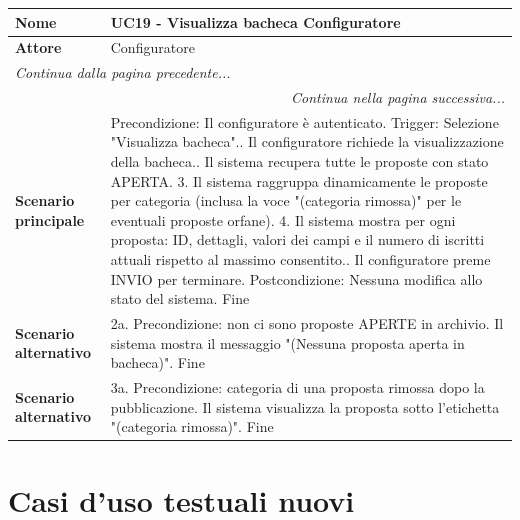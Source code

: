 \documentclass[12pt, a4paper, oneside]{report}
\begin{document}
\begin{tabularx}{\textwidth}{|l|X|}
    \hline
    \textbf{Nome}               & \textbf{UC19 - Visualizza bacheca Configuratore} \\ \hline
    \textbf{Attore}             & Configuratore \\ \hline
    \endfirsthead 
    \hline
    \multicolumn{2}{|l|}{\textit{Continua dalla pagina precedente...}} \\ \hline
    \endhead 
    \hline
    \multicolumn{2}{|r|}{\textit{Continua nella pagina successiva...}} \\ \hline
    \endfoot 
    \hline
    \endlastfoot
    \textbf{Scenario principale} & 
    Precondizione: Il configuratore è autenticato.\newline
    Trigger: Selezione "Visualizza bacheca".\newline
    1. Il configuratore richiede la visualizzazione della bacheca.\newline
    2. Il sistema recupera tutte le proposte con stato APERTA.\newline
    \textcolor{BurntOrange}{3. Il sistema raggruppa dinamicamente le proposte per categoria (inclusa la voce "(categoria rimossa)" per le eventuali proposte orfane).}\newline
    \textcolor{BurntOrange}{4. Il sistema mostra per ogni proposta: ID, dettagli, valori dei campi e il numero di iscritti attuali rispetto al massimo consentito.}\newline
    5. Il configuratore preme INVIO per terminare.\newline
    Postcondizione: Nessuna modifica allo stato del sistema.\newline
    Fine \\ \hline
    \textbf{Scenario alternativo} & 
    2a. Precondizione: non ci sono proposte APERTE in archivio.\newline
    Il sistema mostra il messaggio "(Nessuna proposta aperta in bacheca)".\newline
    Fine \\ \hline
    \textbf{Scenario alternativo} & 
    3a. Precondizione: categoria di una proposta rimossa dopo la pubblicazione.\newline
    Il sistema visualizza la proposta sotto l'etichetta "(categoria rimossa)".\newline
    Fine \\ \hline
\end{tabularx}


\section{Casi d'uso testuali nuovi}
\end{document}
